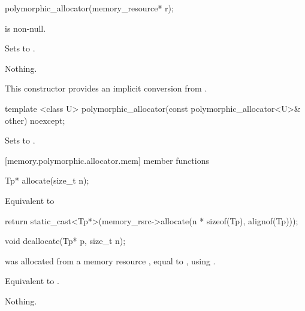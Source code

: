 %
\begin{itemdecl}
polymorphic_allocator(memory_resource* r);
\end{itemdecl}

\begin{itemdescr}
\pnum
\requires
{} is non-null.

\pnum
\effects
Sets  to .

\pnum
\throws
Nothing.

\pnum
\realnotes
This constructor provides an implicit conversion from .
\end{itemdescr}

%
\begin{itemdecl}
template <class U>
  polymorphic_allocator(const polymorphic_allocator<U>& other) noexcept;
\end{itemdecl}

\begin{itemdescr}
\pnum
\effects
Sets  to .
\end{itemdescr}


[memory.polymorphic.allocator.mem]{ member functions}

%
\begin{itemdecl}
Tp* allocate(size_t n);
\end{itemdecl}

\begin{itemdescr}
\pnum
\returns
Equivalent to
\begin{codeblock}
return static_cast<Tp*>(memory_rsrc->allocate(n * sizeof(Tp), alignof(Tp)));
\end{codeblock}
\end{itemdescr}

%
\begin{itemdecl}
void deallocate(Tp* p, size_t n);
\end{itemdecl}

\begin{itemdescr}
\pnum
\requires
{} was allocated from a memory resource ,
equal to ,
using .

\pnum
\effects
Equivalent to .

\pnum
\throws
Nothing.
\end{itemdescr}

